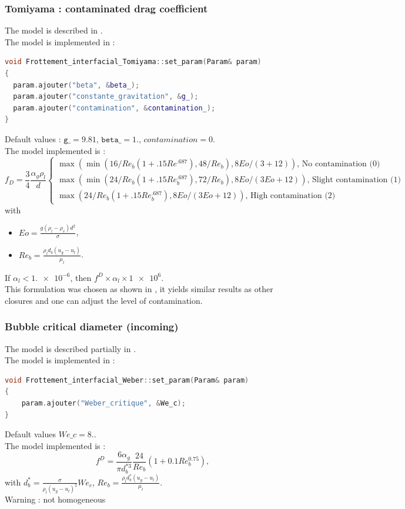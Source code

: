 \subsubsection{Tomiyama : contaminated drag coefficient}
The model is described in \textcite{Tomiyama1998}.\\
The model is implemented in :
\begin{lstlisting}[language=c++]
void Frottement_interfacial_Tomiyama::set_param(Param& param)
{
  param.ajouter("beta", &beta_);
  param.ajouter("constante_gravitation", &g_);
  param.ajouter("contamination", &contamination_);
}
\end{lstlisting}
Default values : $\texttt{g\_}=9.81$, $\texttt{beta\_}=1.$, $contamination=0$.\\
The model implemented is :
\begin{equation}
f_D =\frac{3}{4}\frac{\alpha_g\rho_l}{d} \begin{cases} \max(\min(16/Re_b(1+.15Re^{.687}), 48/Re_b), 8Eo/(3+12)) \text{, No contamination (0)}\\
	\max(\min(24/Re_b(1+.15Re_b^{.687}), 72/Re_b), 8Eo/(3Eo+12)) \text{, Slight contamination (1)}\\
	\max(24/Re_b(1+.15Re_b^{.687}), 8Eo/(3Eo+12)) \text{, High contamination (2)} \end{cases}
\end{equation}
with
\begin{itemize}
    \item[\small \textcolor{blue}{\ding{109}}]$Eo = \frac{g(\rho_l-\rho_v)d^2}{\sigma}$,
    \item[\small \textcolor{blue}{\ding{109}}]$Re_b=\frac{\rho_l d_b (u_g-u_l)}{\mu_l}$.
\end{itemize}
If $\alpha_l < \num{1.e-6}$, then $f^D\times{}\alpha_l\times{}\num{1e6}$.\\
This formulation was chosen as shown in \textcite{Sugrue2017}, it yields similar results as other closures and one can adjust the level of contamination.

\subsubsection{Bubble critical diameter (incoming)}
The model is described partially in \textcite{KUO1988547}.\\
The model is implemented in :
\begin{lstlisting}[language=c++]
void Frottement_interfacial_Weber::set_param(Param& param)
{
    param.ajouter("Weber_critique", &We_c);
}
\end{lstlisting}
Default values $We\_ c=8.$.\\
The model implemented is :
\begin{equation}
   f^{D}=\frac{6\alpha_g}{\pi d_b^{*3}}\frac{24}{Re_b}(1+0.1Re_b^{0.75}),
\end{equation}
with $d_b^*= \frac{\sigma}{\rho_l(u_g-u_l)^2}We_c$, $Re_b=\frac{\rho_l d_b^* (u_g-u_l)}{\mu_l}$.\\
{\color{red} Warning} : not homogeneous

